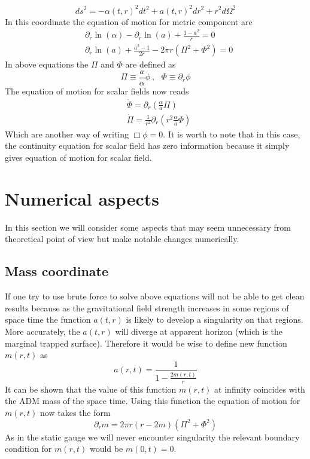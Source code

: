 \documentclass[a4paper,11pt]{article}
\begin{document}
\begin{equation*}
	ds^2=-\alpha(t,r)^2dt^2+a(t,r)^2dr^2+r^2d\Omega^2
\end{equation*} 
In this coordinate the equation of motion for metric component are
\begin{align}\label{3}
	&\partial_r\ln(\alpha)-\partial_r\ln(a)+\frac{1-a^2}{r}=0\\
	&\partial_r\ln(a)+\frac{a^2-1}{2r}-2\pi r(\Pi^2+\Phi^2)=0 	 
\end{align}
In above equations the $\Pi$ and $\Phi$ are defined as
\begin{equation}
	\Pi\equiv\frac{a}{\alpha}\dot{\phi}~,~~~\Phi\equiv \partial_r\phi
\end{equation}
The equation of motion for scalar fields now reads
\begin{align*}
&\dot{\Phi}=\partial_r(\frac{\alpha}{a}\Pi)\\
&\dot{\Pi}=\frac{1}{r^2}\partial_r(r^2\frac{\alpha}{a}\Phi) 
\end{align*}
Which are another way of writing $\Box\phi=0$. It is worth to note that in this case, the continuity equation for scalar field has zero information because it simply gives equation of motion for scalar field.
\section{Numerical aspects}
In this section we will consider some aspects that may seem unnecessary from theoretical point of view but make notable changes numerically.
\subsection{Mass coordinate}
If one try to use brute force to solve above equations will not be able to get clean results because as the gravitational field strength increases in some regions of space time the function $a(t,r)$ is likely to develop a singularity  on that regions. More accurately, the $a(t,r)$ will diverge at apparent horizon (which is the marginal trapped surface). Therefore it would be wise to define new function $m(r,t)$ as
\begin{equation}
	a(r,t)=\frac{1}{1-\frac{2m(r,t)}{r}}
\end{equation} 
It can be shown that the value of this function $m(r,t)$ at infinity coincides with the ADM mass of the space time. Using this function the equation of motion for $m(r,t)$ now takes the form
\begin{equation}
\partial_r m=2\pi r(r-2m) (\Pi^2+\Phi^2)
\end{equation} 
As in the static gauge we will never encounter singularity the relevant boundary condition for $m(r,t)$ would be $m(0,t)=0$. 
\end{document}
